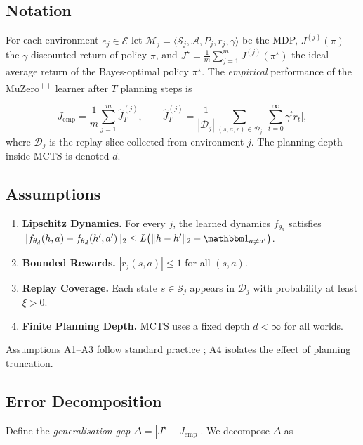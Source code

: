 \subsection{Notation}

For each environment $e_j\in\mathcal E$ let
$\mathcal M_j=\!\langle\mathcal S_j,\mathcal A,P_j,r_j,\gamma\rangle$ be the
MDP, $J^{(j)}(\pi)$ the $\gamma$-discounted return of policy $\pi$, and
$J^\star=\frac1m\sum_{j=1}^{m}J^{(j)}(\pi^\star)$ the ideal average return of
the Bayes-optimal policy $\pi^\star$.  The \emph{empirical} performance of the
MuZero\textsuperscript{++} learner after $T$ planning steps is

\[
J_{\text{emp}}
=\frac{1}{m}\sum_{j=1}^{m}\hat J^{(j)}_T,\qquad
\hat J^{(j)}_T
=\frac{1}{|\mathcal D_j|}\sum_{(s,a,r)\in\mathcal D_j}
      \bigl[\sum_{t=0}^\infty\gamma^tr_t\bigr],
\]
where $\mathcal D_j$ is the replay slice collected from environment $j$.
The planning depth inside MCTS is denoted $d$.

\subsection{Assumptions}\label{app:assumptions}

\begin{enumerate}[label=\textbf{A\arabic*},leftmargin=3em]
\item \textbf{Lipschitz Dynamics.}  
      For every $j$, the learned dynamics
      $f_{\theta_d}$ satisfies
      $\lVert f_{\theta_d}(h,a)-f_{\theta_d}(h',a')\rVert_2
       \le L\bigl(\lVert h-h'\rVert_2+\mathbbm1_{a\neq a'}\bigr)$.
\item \textbf{Bounded Rewards.}  
      $|r_j(s,a)|\le 1$ for all $(s,a)$.
\item \textbf{Replay Coverage.}  
      Each state $s\in\mathcal S_j$ appears in
      $\mathcal D_j$ with probability at least $\xi>0$.
\item \textbf{Finite Planning Depth.}  
      MCTS uses a fixed depth $d<\infty$ for all worlds.
\end{enumerate}

Assumptions A1–A3 follow standard practice
\parencite{bartlett2002rademacher,kearns1999finite}; A4 isolates the effect of
planning truncation.

\subsection{Error Decomposition}

Define the \emph{generalisation gap}
$\Delta = |J^\star - J_{\text{emp}}|$.
We decompose $\Delta$ as


